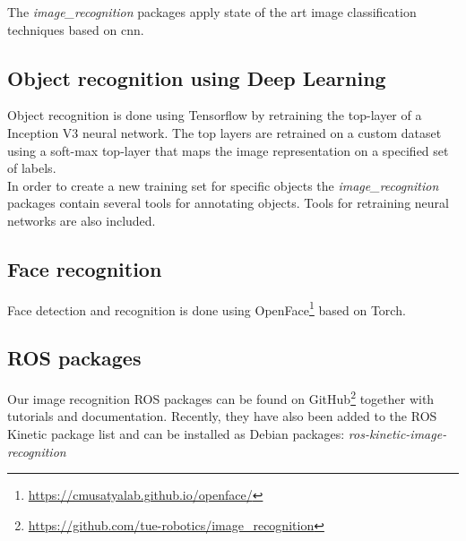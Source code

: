 The \emph{image\_recognition} packages apply state of the art image classification techniques based on \acrfull{cnn}.

\subsection{Object recognition using Deep Learning}
Object recognition is done using Tensorflow\texttrademark\hspace{0em} by retraining the top-layer of a Inception V3 neural network. 
The top layers are retrained on a custom dataset using a soft-max top-layer that maps the image representation on a specified set of labels.
\\
In order to create a new training set for specific objects the \emph{image\_recognition} packages contain several tools for annotating objects. 
Tools for retraining neural networks are also included.

\subsection{Face recognition}
Face detection and recognition is done using OpenFace\footnote{\url{https://cmusatyalab.github.io/openface/}} based on Torch. 
\subsection{ROS packages}
Our image recognition ROS packages can be found on GitHub\footnote{\url{https://github.com/tue-robotics/image_recognition}} together with tutorials and documentation. 
Recently, they have also been added to the ROS Kinetic package list and can be installed as Debian packages: \emph{ros-kinetic-image-recognition} 
